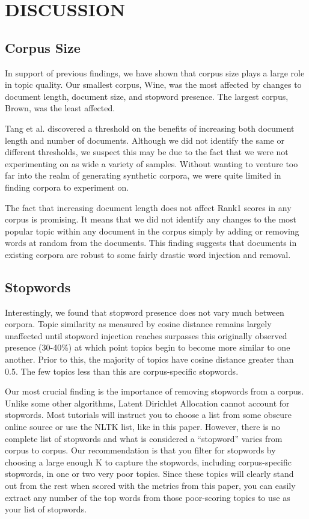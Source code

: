 \documentclass[letterpaper, 10 pt, conference]{ieeeconf}  %
\begin{document}
\section{DISCUSSION}

\subsection{Corpus Size}
In support of previous findings, we have shown that corpus size plays a large role in topic quality. Our smallest corpus, Wine, was the most affected by changes to document length, document size, and stopword presence. The largest corpus, Brown, was the least affected.

Tang et al. discovered a threshold on the benefits of increasing both document length and number of documents. Although we did not identify the same or different thresholds, we suspect this may be due to the fact that we were not experimenting on as wide a variety of samples. Without wanting to venture too far into the realm of generating synthetic corpora, we were quite limited in finding corpora to experiment on.

The fact that increasing document length does not affect Rank1 scores in any corpus is promising. It means that we did not identify any changes to the most popular topic within any document in the corpus simply by adding or removing words at random from the documents. This finding suggests that documents in existing corpora are robust to some fairly drastic word injection and removal.


\subsection{Stopwords}
Interestingly, we found that stopword presence does not vary much between corpora. Topic similarity as measured by cosine distance remains largely unaffected until stopword injection reaches surpasses this originally observed presence (30-40\%) at which point topics begin to become more similar to one another. Prior to this, the majority of topics have cosine distance greater than 0.5. The few topics less than this are corpus-specific stopwords.

Our most crucial finding is the importance of removing stopwords from a corpus. Unlike some other algorithms, Latent Dirichlet Allocation cannot account for stopwords. Most tutorials will instruct you to choose a list from some obscure online source or use the NLTK list, like in this paper. However, there is no complete list of stopwords and what is considered a ``stopword'' varies from corpus to corpus. Our recommendation is that you filter for stopwords by choosing a large enough K to capture the stopwords, including corpus-specific stopwords, in one or two very poor topics. Since these topics will clearly stand out from the rest when scored with the metrics from this paper, you can easily extract any number of the top words from those poor-scoring topics to use as your list of stopwords.
\end{document}
